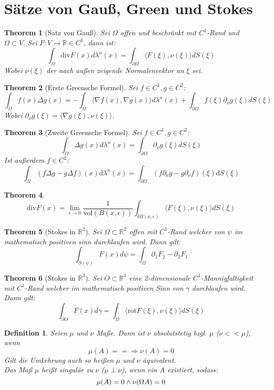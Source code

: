 \documentclass[10pt,a4paper]{article}
\newtheorem{theorem}{Theorem}
\newtheorem{definition}{Definition}
\begin{document}
\section{Sätze von Gauß, Green und Stokes}
\begin{theorem}[Satz von Gauß]
	Sei $\Omega$ offen und beschränkt mit $C^1$-Rand und $\overline{\Omega} \subset V$. Sei $F:V \to \mathbb{R}\in C^1$, dann ist:
	$$\int_\Omega \text{div} F(x)d\lambda^n(x) = \int_{\partial\Omega}\langle F(\xi), \nu(\xi)\rangle dS(\xi)$$
	Wobei $\nu(\xi)$ der nach außen zeigende Normalenvektor an $\xi$ sei.
\end{theorem}
\begin{theorem}[Erste Greensche Formel]
	Sei $f\in C^1, g\in C^2$:
	$$\int_{\Omega}f(x)\Delta g(x)= -\int_\Omega \langle\nabla f(x), \nabla g(x)\rangle d\lambda^n(x) + \int_{\partial\Omega}f(\xi)\partial_\nu g(\xi)dS(\xi)$$
	Wobei $\partial_\nu g(\xi) = \langle \nabla g(\xi), \nu(\xi)\rangle$.
\end{theorem}
\begin{theorem}[Zweite Greensche Formel]
	Sei $f\in C^1, g\in C^2$:
	$$\int_{\Omega}\Delta g(x) d\lambda^n(x) = \int_{\partial\Omega}\partial_\nu g(\xi)dS(\xi)$$
	Ist außerdem $f\in C^2$:
	$$\int_{\Omega}(f \Delta g-g \Delta f)(x) \mathrm{d} \lambda^n(x)=\int_{\partial \Omega}\left(f \partial_\nu g-g \partial_\nu f\right)(\xi) \mathrm{d} S(\xi)$$
\end{theorem}
\begin{theorem}
	$$\text{div} F(x) = \lim_{\epsilon \to 0}\frac{1}{\text{vol}(B(x, \epsilon))}\int_{\delta B(x,\epsilon)} \langle F(\xi), \nu(\xi)\rangle dS(\xi)$$
\end{theorem}
\begin{theorem}[Stokes in $\mathbb{R}^2$]
	Sei $\Omega \subset \mathbb{R}^2$ offen mit $C^1$-Rand welcher von $\psi$ im mathematisch positiven sinn durchlaufen wird. Dann gilt:
	$$\int_{S(\psi)} F(x) d\psi = \int_\Omega \partial_1 F_2 -\partial_2F_1$$
\end{theorem}
\begin{theorem}[Stokes in $\mathbb{R}^3$]
	Sei $O \subset \mathbb{R}^3$  eine 2-dimensionale $C^1$-Mannigfaltigkeit mit $C^1$-Rand welcher im mathematisch positiven Sinn von $\gamma$ durchlaufen wird. Dann gilt:
	$$\int_{\partial O} F(x) d\gamma = \int_\Omega \langle \text{rot}F(\xi), \nu(\xi)\rangle dS(\xi)$$
\end{theorem}
\begin{definition}
	Seien $\mu$ und $\nu$ Maße. 
	Dann ist $\nu$ absolutstetig bzgl. $\mu$ ($\nu << \mu$), wenn $$\mu(A) = = \Rightarrow \nu(A)= 0$$
	Gilt die Umkehrung auch so heißen $\mu$ und $\nu$ äquivalent.\\
	Das Maß $\mu$ heißt singulär zu $\nu$ ($\mu \perp \nu$), wenn ein $A$ existiert, sodass:
	$$\mu(A) = 0 \land \nu(\Omega\\A) = 0$$
\end{definition}
\end{document}
